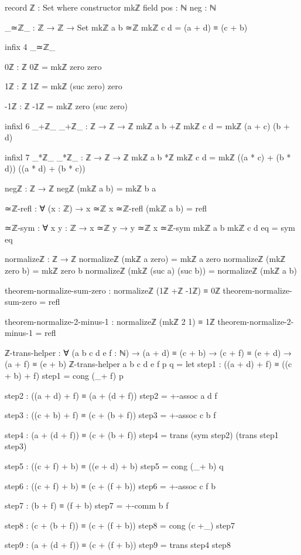 \documentclass[11pt,a4paper]{book}
\begin{document}
\begin{code}
record ℤ : Set where
  constructor mkℤ
  field
    pos : ℕ
    neg : ℕ

_≃ℤ_ : ℤ → ℤ → Set
mkℤ a b ≃ℤ mkℤ c d = (a + d) ≡ (c + b)

infix 4 _≃ℤ_

0ℤ : ℤ
0ℤ = mkℤ zero zero

1ℤ : ℤ
1ℤ = mkℤ (suc zero) zero

-1ℤ : ℤ
-1ℤ = mkℤ zero (suc zero)

infixl 6 _+ℤ_
_+ℤ_ : ℤ → ℤ → ℤ
mkℤ a b +ℤ mkℤ c d = mkℤ (a + c) (b + d)

infixl 7 _*ℤ_
_*ℤ_ : ℤ → ℤ → ℤ
mkℤ a b *ℤ mkℤ c d = mkℤ ((a * c) + (b * d)) ((a * d) + (b * c))

negℤ : ℤ → ℤ
negℤ (mkℤ a b) = mkℤ b a

≃ℤ-refl : ∀ (x : ℤ) → x ≃ℤ x
≃ℤ-refl (mkℤ a b) = refl

≃ℤ-sym : ∀ {x y : ℤ} → x ≃ℤ y → y ≃ℤ x
≃ℤ-sym {mkℤ a b} {mkℤ c d} eq = sym eq

normalizeℤ : ℤ → ℤ
normalizeℤ (mkℤ a       zero)    = mkℤ a zero
normalizeℤ (mkℤ zero    b)       = mkℤ zero b
normalizeℤ (mkℤ (suc a) (suc b)) = normalizeℤ (mkℤ a b)

theorem-normalize-sum-zero : normalizeℤ (1ℤ +ℤ -1ℤ) ≡ 0ℤ
theorem-normalize-sum-zero = refl

theorem-normalize-2-minus-1 : normalizeℤ (mkℤ 2 1) ≡ 1ℤ
theorem-normalize-2-minus-1 = refl

ℤ-trans-helper : ∀ (a b c d e f : ℕ)
               → (a + d) ≡ (c + b)
               → (c + f) ≡ (e + d)
               → (a + f) ≡ (e + b)
ℤ-trans-helper a b c d e f p q =
  let
    step1 : ((a + d) + f) ≡ ((c + b) + f)
    step1 = cong (_+ f) p
    
    step2 : ((a + d) + f) ≡ (a + (d + f))
    step2 = +-assoc a d f
    
    step3 : ((c + b) + f) ≡ (c + (b + f))
    step3 = +-assoc c b f
    
    step4 : (a + (d + f)) ≡ (c + (b + f))
    step4 = trans (sym step2) (trans step1 step3)
    

    step5 : ((c + f) + b) ≡ ((e + d) + b)
    step5 = cong (_+ b) q
    
    step6 : ((c + f) + b) ≡ (c + (f + b))
    step6 = +-assoc c f b
    
    step7 : (b + f) ≡ (f + b)
    step7 = +-comm b f
    
    step8 : (c + (b + f)) ≡ (c + (f + b))
    step8 = cong (c +_) step7
    
    step9 : (a + (d + f)) ≡ (c + (f + b))
    step9 = trans step4 step8
    

\end{code}
\end{document}
